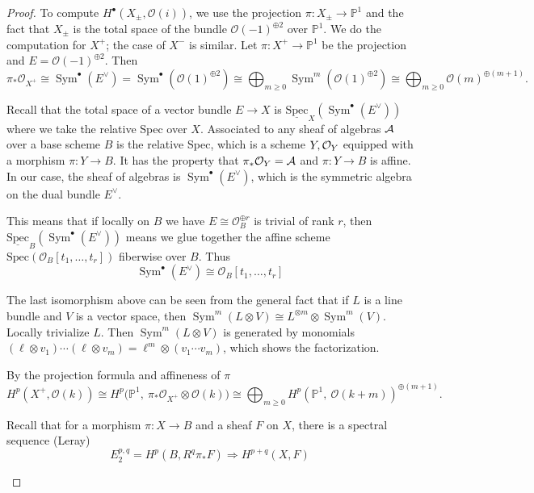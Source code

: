 \documentclass[12pt]{article}
\begin{document}
\begin{proof}
To compute $H^\bullet(X_\pm,\mathcal{O}(i))$, we use the projection $\pi:X_\pm\to\mathbb{P}^1$ and the fact that $X_\pm$ is the total space of the bundle $\mathcal{O}(-1)^{\oplus 2}$ over $\mathbb{P}^1$. We do the computation for $X^+$; the case of $X^-$ is similar. Let $\pi:X^+\to \mathbb{P}^1$ be the projection and $E=\mathcal{O}(-1)^{\oplus 2}$. Then
\[
  \pi_*\mathcal{O}_{X^+}\cong\operatorname{Sym}^\bullet(E^\vee)
  =\operatorname{Sym}^\bullet(\mathcal{O}(1)^{\oplus 2})
  \cong\bigoplus_{m\ge0}\operatorname{Sym}^m(\mathcal{O}(1)^{\oplus 2})
  \cong\bigoplus_{m\ge0}\mathcal{O}(m)^{\oplus (m+1)}.
\]

\begin{remark}
  Recall that the total space of a vector bundle $E\to X$ is $\underline{\mathrm{Spec}}_X(\operatorname{Sym}^\bullet(E^\vee))$ where we take the relative Spec over $X$. Associated to any sheaf of algebras ${\mathcal{A}}$ over a base scheme $B$ is the relative Spec, which is a scheme $Y,{\mathcal{O}}_Y$ equipped with a morphism $\pi:Y\to B$. It has the property that $\pi_*{\mathcal{O}}_Y={\mathcal{A}}$ and $\pi:Y\to B$ is affine. In our case, the sheaf of algebras is $\operatorname{Sym}^\bullet(E^\vee)$, which is the symmetric algebra on the dual bundle $E^\vee$.

  This means that if locally on $B$ we have $E \cong \mathcal{O}_B^{\oplus r}$ is trivial of rank $r$, then  $\underline{\mathrm{Spec}}_B(\operatorname{Sym}^\bullet(E^\vee))$ means we glue together the affine scheme $\mathrm{Spec}(\mathcal{O}_B[t_1,\dots,t_r])$ fiberwise over $B$. Thus \[\operatorname{Sym}^\bullet(E^\vee) \cong \mathcal{O}_B[t_1,\dots,t_r]\]

  The last isomorphism above can be seen from the general fact that if $L$ is a line bundle and $V$ is a vector space, then $\operatorname{Sym}^m(L\otimes V) \cong L^{\otimes m}\otimes \operatorname{Sym}^m(V)$. Locally trivialize $L$. Then $\operatorname{Sym}^m(L\otimes V)$ is generated by monomials $(\ell\otimes v_1)\cdots (\ell\otimes v_m) = \ell^m \otimes (v_1\cdots v_m)$, which shows the factorization.
\end{remark}

By the projection formula and affineness of $\pi$ \[
  H^p(X^+,\mathcal{O}(k))
  \cong
  H^p\Big(\mathbb{P}^1,\ \pi_*\mathcal{O}_{X^+}\otimes\mathcal{O}(k)\Big)
  \cong
  \bigoplus_{m\ge0} H^p(\mathbb{P}^1,\ \mathcal{O}(k+m))^{\oplus (m+1)}.
\]

\begin{remark}
  Recall that for a morphism $\pi:X\to B$ and a sheaf $F$ on $X$, there is a spectral sequence (Leray) \[E_2^{p,q} = H^p(B, R^q\pi_*F) \Longrightarrow H^{p+q}(X,F)\]


\end{remark}
\end{proof}
\end{document}
